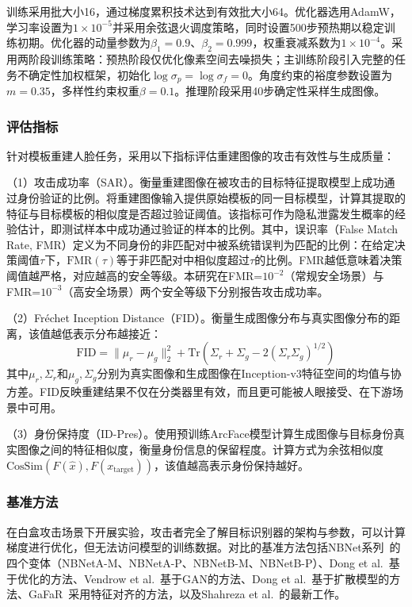 训练采用批大小16，通过梯度累积技术达到有效批大小64。优化器选用AdamW，学习率设置为$1\times10^{-5}$并采用余弦退火调度策略，同时设置500步预热期以稳定训练初期。优化器的动量参数为$\beta_1=0.9$、$\beta_2=0.999$，权重衰减系数为$1\times10^{-4}$。采用两阶段训练策略：预热阶段仅优化像素空间去噪损失；主训练阶段引入完整的任务不确定性加权框架，初始化$\log\sigma_p = \log\sigma_f = 0$。角度约束的裕度参数设置为$m=0.35$，多样性约束权重$\beta=0.1$。推理阶段采用40步确定性采样生成图像。

\subsubsection{评估指标}

针对模板重建人脸任务，采用以下指标评估重建图像的攻击有效性与生成质量：

（1）攻击成功率（SAR）。衡量重建图像在被攻击的目标特征提取模型上成功通过身份验证的比例。将重建图像输入提供原始模板的同一目标模型，计算其提取的特征与目标模板的相似度是否超过验证阈值。该指标可作为隐私泄露发生概率的经验估计，即测试样本中成功通过验证的样本的比例。其中，误识率（False Match Rate, FMR）定义为不同身份的非匹配对中被系统错误判为匹配的比例：在给定决策阈值$\tau$下，$\text{FMR}(\tau)$等于非匹配对中相似度超过$\tau$的比例。FMR越低意味着决策阈值越严格，对应越高的安全等级。本研究在FMR=$10^{-2}$（常规安全场景）与FMR=$10^{-3}$（高安全场景）两个安全等级下分别报告攻击成功率。

（2）Fréchet Inception Distance（FID）。衡量生成图像分布与真实图像分布的距离，该值越低表示分布越接近：
\begin{equation}
\text{FID} = \|\mu_r - \mu_g\|_2^2 + \text{Tr}(\Sigma_r + \Sigma_g - 2(\Sigma_r\Sigma_g)^{1/2})
\end{equation}
其中$\mu_r, \Sigma_r$和$\mu_g, \Sigma_g$分别为真实图像和生成图像在Inception-v3特征空间的均值与协方差。FID反映重建结果不仅在分类器里有效，而且更可能被人眼接受、在下游场景中可用。

（3）身份保持度（ID-Pres）。使用预训练ArcFace模型计算生成图像与目标身份真实图像之间的特征相似度，衡量身份信息的保留程度。计算方式为余弦相似度$\text{CosSim}(F(\hat{x}), F(x_{\text{target}}))$，该值越高表示身份保持越好。

\subsubsection{基准方法}

在白盒攻击场景下开展实验，攻击者完全了解目标识别器的架构与参数，可以计算梯度进行优化，但无法访问模型的训练数据。对比的基准方法包括NBNet系列~\cite{mai2018reconstruction}的四个变体（NBNetA-M、NBNetA-P、NBNetB-M、NBNetB-P）、Dong et al.~\cite{dong2021towards}基于优化的方法、Vendrow et al.~\cite{vendrow2021realistic}基于GAN的方法、Dong et al.~\cite{dong2023reconstruct}基于扩散模型的方法、GaFaR~\cite{shahreza2023template}采用特征对齐的方法，以及Shahreza et al.~\cite{shahreza2024template}的最新工作。

